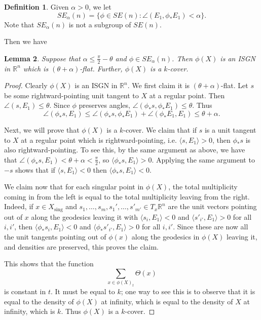 \documentclass[11pt,reqno,twoside]{amsart}
\newcommand{\sing}{\mathrm{sing}}
\newtheorem{lemma}{Lemma}
\theoremstyle{definition}
\newtheorem{definition}[lemma]{Definition}
\begin{document}
\begin{definition}
Given $\alpha > 0$, we let 
\[SE_\alpha(n) = \{\phi \in SE(n): \angle(E_1,\phi_*E_1) < \alpha\}.\] Note that $SE_\alpha(n)$ is not a subgroup of $SE(n)$.
\end{definition}

Then we have 

\begin{lemma} \label{rotation-preserves}
    Suppose that $\alpha \leq \frac{\pi}{2} - \theta$ and $\phi \in SE_\alpha(n)$. Then $\phi(X)$ is an ISGN in $\mathbb{R}^n$ which is $(\theta + \alpha)$-flat. Further, $\phi(X)$ is a $k$-cover.
\end{lemma}

\begin{proof}
    Clearly $\phi(X)$ is an ISGN in $\mathbb{R}^n$. We first claim it is $(\theta+\alpha)$-flat. Let $s$ be some rightward-pointing unit tangent to $X$ at a regular point. Then $\angle(s,E_1) \leq \theta$. Since $\phi$ preserves angles, $\angle(\phi_* s, \phi_* E_1) \leq \theta$. Thus \[\angle(\phi_* s, E_1) \leq \angle(\phi_* s, \phi_* E_1) + \angle(\phi_* E_1, E_1) \leq \theta + \alpha.\]

    Next, we will prove that $\phi(X)$ is a $k$-cover. We claim that if $s$ is a unit tangent to $X$ at a regular point which is rightward-pointing, i.e. $\langle s,E_1\rangle > 0$, then $\phi_* s$ is also rightward-pointing. To see this, by the same argument as above, we have that $\angle(\phi_*s,E_1) < \theta + \alpha < \frac{\pi}{2}$, so $\langle \phi_*s,E_1\rangle > 0$. Applying the same argument to $-s$ shows that if $\langle s,E_1\rangle < 0$ then $\langle \phi_* s, E_1\rangle < 0$.

    We claim now that for each singular point in $\phi(X)$, the total multiplicity coming in from the left is equal to the total multiplicity leaving from the right.
    Indeed, if $x \in X_\sing$ and $s_1,\ldots,s_m,s_1',\ldots,s'_{m'} \in T_x\mathbb{R}^n$ are the unit vectors pointing out of $x$ along the geodesics leaving it with $\langle s_i,E_1\rangle < 0$ and $\langle s'_{i'},E_1\rangle > 0$ for all $i,i'$, then $\langle \phi_*s_i,E_1\rangle < 0$ and $\langle \phi_*s'_{i'},E_1\rangle > 0$ for all $i,i'$. Since these are now all the unit tangents pointing out of $\phi(x)$ along the geodesics in $\phi(X)$ leaving it, and densities are preserved, this proves the claim.

    This shows that the function
    \[\sum_{x \in \phi(X)_t} \Theta(x)\]
    is constant in $t$. It must be equal to $k$; one way to see this is to observe that it is equal to the density of $\phi(X)$ at infinity, which is equal to the density of $X$ at infinity, which is $k$. Thus $\phi(X)$ is a $k$-cover.
\end{proof}
\end{document}
